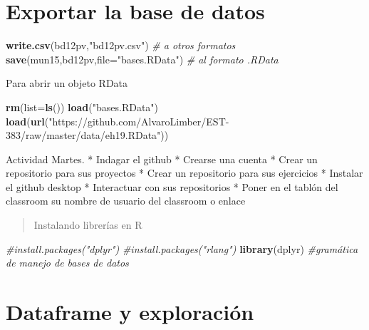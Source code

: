 \documentclass[
]{book}
\newenvironment{Shaded}{\begin{snugshade}}{\end{snugshade}}
\newcommand{\CommentTok}[1]{\textcolor[rgb]{0.56,0.35,0.01}{\textit{#1}}}
\newcommand{\DataTypeTok}[1]{\textcolor[rgb]{0.13,0.29,0.53}{#1}}
\newcommand{\KeywordTok}[1]{\textcolor[rgb]{0.13,0.29,0.53}{\textbf{#1}}}
\newcommand{\NormalTok}[1]{#1}
\newcommand{\StringTok}[1]{\textcolor[rgb]{0.31,0.60,0.02}{#1}}
\begin{document}
\hypertarget{exportar-la-base-de-datos}{%
\section{Exportar la base de datos}\label{exportar-la-base-de-datos}}

\begin{Shaded}
\begin{Highlighting}[]
\KeywordTok{write.csv}\NormalTok{(bd12pv,}\StringTok{"bd12pv.csv"}\NormalTok{) }\CommentTok{# a otros formatos}
\KeywordTok{save}\NormalTok{(mun15,bd12pv,}\DataTypeTok{file=}\StringTok{"bases.RData"}\NormalTok{) }\CommentTok{# al formato .RData}
\end{Highlighting}
\end{Shaded}

Para abrir un objeto RData

\begin{Shaded}
\begin{Highlighting}[]
\KeywordTok{rm}\NormalTok{(}\DataTypeTok{list=}\KeywordTok{ls}\NormalTok{())}
\KeywordTok{load}\NormalTok{(}\StringTok{"bases.RData"}\NormalTok{)}
\KeywordTok{load}\NormalTok{(}\KeywordTok{url}\NormalTok{(}\StringTok{"https://github.com/AlvaroLimber/EST-383/raw/master/data/eh19.RData"}\NormalTok{))}
\end{Highlighting}
\end{Shaded}

Actividad Martes.
* Indagar el github
* Crearse una cuenta
* Crear un repositorio para sus proyectos
* Crear un repositorio para sus ejercicios
* Instalar el github desktop
* Interactuar con sus repositorios
* Poner en el tablón del classroom su nombre de usuario del classroom o enlace

\begin{quote}
Instalando librerías en R
\end{quote}

\begin{Shaded}
\begin{Highlighting}[]
\CommentTok{#install.packages("dplyr")}
\CommentTok{#install.packages("rlang")}
\KeywordTok{library}\NormalTok{(dplyr) }\CommentTok{#gramática de manejo de bases de datos }
\end{Highlighting}
\end{Shaded}

\hypertarget{dataframe-y-exploraciuxf3n}{%
\section{Dataframe y exploración}\label{dataframe-y-exploraciuxf3n}}
\end{document}
